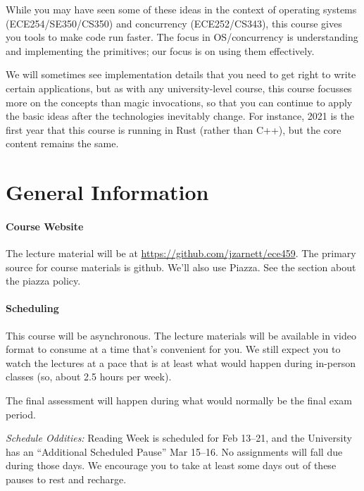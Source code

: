 \documentclass[letterpaper,10pt]{article}
\begin{document}
While you may have seen some of these ideas in the context of
operating systems (ECE254/SE350/CS350) and concurrency (ECE252/CS343), this course gives you tools to make code run
faster. The focus in OS/concurrency is understanding and implementing the
primitives; our focus is on using them effectively. 

We will sometimes see implementation details that you need to get right to write
certain applications, but as with any university-level course, this course
focusses more on the concepts than magic invocations, so that you can continue
to apply the basic ideas after the technologies inevitably change. For instance,
2021 is the first year that this course is running in Rust (rather than C++),
but the core content remains the same.


\section*{General Information}

\paragraph{Course Website} The lecture material will be at \url{https://github.com/jzarnett/ece459}. The primary source for course materials is github. We'll also use Piazza. See the section about the piazza policy.

\paragraph{Scheduling}
This course will be asynchronous. The lecture materials will be available in video format to consume at a time that's convenient for you. We still expect you to watch the lectures at a pace that is at least what would happen during in-person classes (so, about 2.5 hours per week). 


  
The final assessment will happen during what would normally be the final exam period. 

\textit{Schedule Oddities:} Reading Week is scheduled for Feb 13--21, and the University has an ``Additional Scheduled Pause'' Mar 15--16. No assignments will fall due during those days. We encourage you to take at least some days out of these pauses to rest and recharge.
\end{document}

